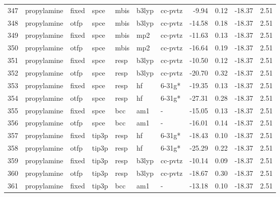 \begin{tabular}{lllllllrrrr}
347 &                   propylamine &  fixed &   spce &   mbis &   b3lyp &      cc-pvtz &       -9.94 &     0.12 &      -18.37 &      2.51 \\
348 &                   propylamine &   otfp &   spce &   mbis &   b3lyp &      cc-pvtz &      -14.58 &     0.18 &      -18.37 &      2.51 \\
349 &                   propylamine &  fixed &   spce &   mbis &     mp2 &      cc-pvtz &      -11.63 &     0.13 &      -18.37 &      2.51 \\
350 &                   propylamine &   otfp &   spce &   mbis &     mp2 &      cc-pvtz &      -16.64 &     0.19 &      -18.37 &      2.51 \\
351 &                   propylamine &  fixed &   spce &   resp &   b3lyp &      cc-pvtz &      -10.50 &     0.12 &      -18.37 &      2.51 \\
352 &                   propylamine &   otfp &   spce &   resp &   b3lyp &      cc-pvtz &      -20.70 &     0.32 &      -18.37 &      2.51 \\
353 &                   propylamine &  fixed &   spce &   resp &      hf &       6-31g* &      -19.35 &     0.13 &      -18.37 &      2.51 \\
354 &                   propylamine &   otfp &   spce &   resp &      hf &       6-31g* &      -27.31 &     0.28 &      -18.37 &      2.51 \\
355 &                   propylamine &  fixed &   spce &    bcc &     am1 &            - &      -15.05 &     0.13 &      -18.37 &      2.51 \\
356 &                   propylamine &   otfp &   spce &    bcc &     am1 &            - &      -16.01 &     0.14 &      -18.37 &      2.51 \\
357 &                   propylamine &  fixed &  tip3p &   resp &      hf &       6-31g* &      -18.43 &     0.10 &      -18.37 &      2.51 \\
358 &                   propylamine &   otfp &  tip3p &   resp &      hf &       6-31g* &      -25.29 &     0.22 &      -18.37 &      2.51 \\
359 &                   propylamine &  fixed &  tip3p &   resp &   b3lyp &      cc-pvtz &      -10.14 &     0.09 &      -18.37 &      2.51 \\
360 &                   propylamine &   otfp &  tip3p &   resp &   b3lyp &      cc-pvtz &      -18.67 &     0.30 &      -18.37 &      2.51 \\
361 &                   propylamine &  fixed &  tip3p &    bcc &     am1 &            - &      -13.18 &     0.10 &      -18.37 &      2.51 \\

\end{tabular}
